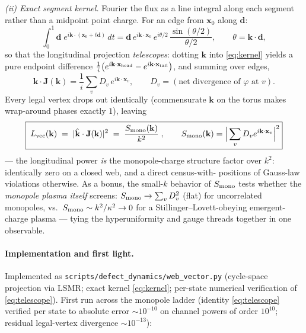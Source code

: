 \documentclass[11pt]{article}
\newcommand{\kh}{\hat{\mathbf k}}
\newcommand{\kv}{\mathbf k}
\begin{document}
\emph{(ii) Exact segment kernel.} Fourier the flux as a line integral along
each segment rather than a midpoint point charge. For an edge from
$\mathbf x_0$ along $\mathbf d$:
\begin{equation}
\int_0^1 \mathbf d\; e^{i\kv\cdot(\mathbf x_0 + t\mathbf d)}\,dt
= \mathbf d\, e^{i\kv\cdot\mathbf x_0}\,
e^{i\theta/2}\,\frac{\sin(\theta/2)}{\theta/2},
\qquad \theta = \kv\cdot\mathbf d,
\label{eq:kernel}
\end{equation}
so that the longitudinal projection \emph{telescopes}: dotting $\kv$ into
\eqref{eq:kernel} yields a pure endpoint difference
$\tfrac1i\!\left(e^{i\kv\cdot\mathbf x_{\rm head}} -
e^{i\kv\cdot\mathbf x_{\rm tail}}\right)$, and summing over edges,
\begin{equation}
\kv\cdot\mathbf J(\kv)
= \frac1i \sum_v D_v\, e^{i\kv\cdot\mathbf x_v},
\qquad D_v = (\text{net divergence of }\varphi\text{ at } v).
\label{eq:telescope}
\end{equation}
Every legal vertex drops out identically (commensurate $\kv$ on the torus
makes wrap-around phases exactly $1$), leaving
\begin{equation}
\boxed{\;
L_{\rm vec}(\kv) \;=\; |\kh\cdot\mathbf J(\kv)|^2
\;=\; \frac{S_{\rm mono}(\kv)}{k^2}\;,
\qquad
S_{\rm mono}(\kv) = \Big|\sum_v D_v e^{i\kv\cdot\mathbf x_v}\Big|^2
}
\label{eq:identity}
\end{equation}
--- the longitudinal power \emph{is} the monopole-charge structure factor
over $k^2$: identically zero on a closed web, and a direct census-with-
positions of Gauss-law violations otherwise. As a bonus, the small-$k$
behavior of $S_{\rm mono}$ tests whether the \emph{monopole plasma itself}
screens: $S_{\rm mono} \to \sum_v D_v^2$ (flat) for uncorrelated monopoles,
vs.\ $S_{\rm mono} \sim k^2/\kappa^2 \to 0$ for a Stillinger--Lovett-obeying
emergent-charge plasma --- tying the hyperuniformity and gauge threads
together in one observable.

\paragraph{Implementation and first light.} Implemented as
\texttt{scripts/defect\_dynamics/web\_vector.py} (cycle-space projection via
LSMR; exact kernel \eqref{eq:kernel}; per-state numerical verification of
\eqref{eq:telescope}). First run across the monopole ladder
(identity \eqref{eq:telescope} verified per state to absolute error
$\sim\!10^{-10}$ on channel powers of order $10^{10}$; residual legal-vertex
divergence $\sim\!10^{-13}$):
\end{document}
